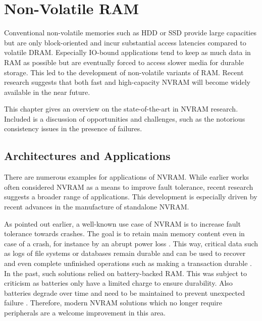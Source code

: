 \chapter{Non-Volatile RAM}
\label{ch:nvram}

Conventional non-volatile memories such as HDD or SSD provide large capacities but are only block-oriented and incur substantial access latencies compared to volatile DRAM. Especially IO-bound applications tend to keep as much data in RAM as possible but are eventually forced to access slower media for durable storage. This led to the development of non-volatile variants of RAM. Recent research suggests that both fast and high-capacity NVRAM will become widely available in the near future.

This chapter gives an overview on the state-of-the-art in NVRAM research.
Included is a discussion of opportunities and challenges, such as the notorious
consistency issues in the presence of failures.

\section{Architectures and Applications}

There are numerous examples for applications of NVRAM. While earlier works often
considered NVRAM as a means to improve fault tolerance, recent research suggests
a broader range of applications. This development is especially driven by
recent advances in the manufacture of standalone NVRAM.

As pointed out earlier, a well-known use case of NVRAM is to increase fault
tolerance towards crashes. The goal is to retain main memory content even in
case of a crash, for instance by an abrupt power loss \cite{molina1992main,
eich1986main}. This way, critical data such as logs of file systems or databases
remain durable and can be used to recover and even complete unfinished
operations such as making a transaction durable \cite{liskov1991replication,
chen1996rio}. In the past, such solutions relied on battery-backed RAM. This was
subject to criticism as batteries only have a limited charge to ensure
durability. Also batteries degrade over time and need to be maintained to
prevent unexpected failure \cite{molina1992main}. Therefore, modern NVRAM
solutions which no longer require peripherals are a welcome improvement in this
area.

